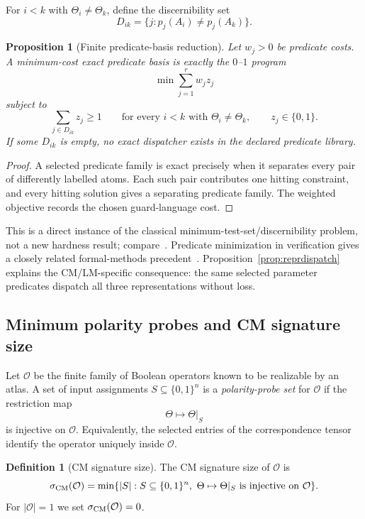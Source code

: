 \documentclass[11pt]{article}
\newtheorem{proposition}[theorem]{Proposition}
\theoremstyle{definition}
\newtheorem{definition}[theorem]{Definition}
\theoremstyle{remark}
\newcommand{\B}{\{0,1\}}
\begin{document}
For $i<k$ with $\Theta_i\ne\Theta_k$, define the discernibility set
\[
 D_{ik}=\{j:p_j(A_i)\ne p_j(A_k)\}.
\]

\begin{proposition}[Finite predicate-basis reduction]\label{prop:predicateILP}
Let $w_j>0$ be predicate costs. A minimum-cost exact predicate basis is exactly the $0$--$1$ program
\[
 \min \sum_{j=1}^r w_j z_j
\]
subject to
\[
 \sum_{j\in D_{ik}}z_j\ge1
 \qquad
 \text{for every }i<k\text{ with }\Theta_i\ne\Theta_k,
 \qquad z_j\in\{0,1\}.
\]
If some $D_{ik}$ is empty, no exact dispatcher exists in the declared predicate library.
\end{proposition}

\begin{proof}
A selected predicate family is exact precisely when it separates every pair of differently labelled atoms. Each such pair contributes one hitting constraint, and every hitting solution gives a separating predicate family. The weighted objective records the chosen guard-language cost.
\end{proof}

This is a direct instance of the classical minimum-test-set/discernibility problem, not a new hardness result; compare~\cite{MoretShapiro1985,BermanDasGuptaKao2005}. Predicate minimization in verification gives a closely related formal-methods precedent~\cite{ChakiEtAl2003}. Proposition~\ref{prop:reprdispatch} explains the CM/LM-specific consequence: the same selected parameter predicates dispatch all three representations without loss.

\subsection{Minimum polarity probes and CM signature size}

Let $\mathcal O$ be the finite family of Boolean operators known to be realizable by an atlas. A set of input assignments $S\subseteq\B^n$ is a \emph{polarity-probe set} for $\mathcal O$ if the restriction map
\[
 \Theta\longmapsto \Theta|_S
\]
is injective on $\mathcal O$. Equivalently, the selected entries of the correspondence tensor identify the operator uniquely inside $\mathcal O$.

\begin{definition}[CM signature size]\label{def:cmsignature}
The CM signature size of $\mathcal O$ is
\[
 \sigma_{\rm CM}(\mathcal O)
 =\min\{|S|:S\subseteq\B^n,\ \Theta\mapsto\Theta|_S\text{ is injective on }\mathcal O\}.
\]
For $|\mathcal O|=1$ we set $\sigma_{\rm CM}(\mathcal O)=0$.
\end{definition}
\end{document}
